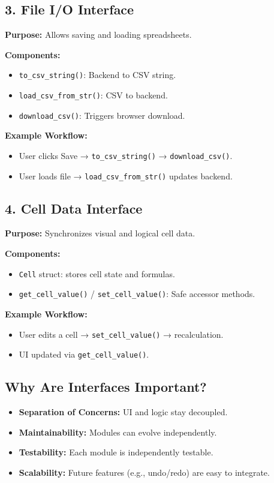 \documentclass{article}
\begin{document}
\subsection*{3. File I/O Interface}
\textbf{Purpose:} Allows saving and loading spreadsheets.

\textbf{Components:}
\begin{itemize}
    \item \texttt{to\_csv\_string()}: Backend to CSV string.
    \item \texttt{load\_csv\_from\_str()}: CSV to backend.
    \item \texttt{download\_csv()}: Triggers browser download.
\end{itemize}

\textbf{Example Workflow:}
\begin{itemize}
    \item User clicks Save → \texttt{to\_csv\_string()} → \texttt{download\_csv()}.
    \item User loads file → \texttt{load\_csv\_from\_str()} updates backend.
\end{itemize}

\subsection*{4. Cell Data Interface}
\textbf{Purpose:} Synchronizes visual and logical cell data.

\textbf{Components:}
\begin{itemize}
    \item \texttt{Cell} struct: stores cell state and formulas.
    \item \texttt{get\_cell\_value()} / \texttt{set\_cell\_value()}: Safe accessor methods.
\end{itemize}

\textbf{Example Workflow:}
\begin{itemize}
    \item User edits a cell → \texttt{set\_cell\_value()} → recalculation.
    \item UI updated via \texttt{get\_cell\_value()}.
\end{itemize}

\subsection*{Why Are Interfaces Important?}
\begin{itemize}
    \item \textbf{Separation of Concerns:} UI and logic stay decoupled.
    \item \textbf{Maintainability:} Modules can evolve independently.
    \item \textbf{Testability:} Each module is independently testable.
    \item \textbf{Scalability:} Future features (e.g., undo/redo) are easy to integrate.
\end{itemize}
\end{document}

